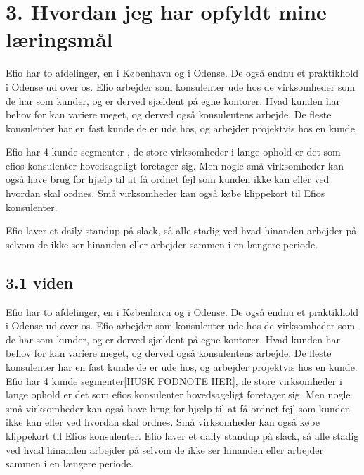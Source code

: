 \documentclass[11pt]{report}
\begin{document}
\chapter*{3. Hvordan jeg har opfyldt mine læringsmål}
Efio har to afdelinger, en i København og i Odense. De også endnu et praktikhold i Odense ud over os. 
Efio arbejder som konsulenter ude hos de virksomheder som de har som kunder, og er derved sjældent på egne kontorer. 
Hvad kunden har behov for kan variere meget, og derved også konsulentens arbejde. 
De fleste konsulenter har en fast kunde de er ude hos, og arbejder projektvis hos en kunde. 

Efio har 4 kunde segmenter , de store virksomheder i lange ophold er det som efios konsulenter hovedsageligt foretager sig. 
Men nogle små virksomheder kan også have brug for hjælp til at få ordnet fejl som kunden ikke kan eller ved hvordan skal ordnes. 
Små virksomheder kan også købe klippekort til Efios konsulenter.

Efio laver et daily standup på slack, så alle stadig ved hvad hinanden arbejder på selvom de ikke ser hinanden eller arbejder sammen 
i en længere periode. 

\section*{3.1 viden}
Efio har to afdelinger, en i København og i Odense. De også endnu et praktikhold i Odense ud over os. 
Efio arbejder som konsulenter ude hos de virksomheder som de har som kunder, og er derved sjældent på egne kontorer. 
Hvad kunden har behov for kan variere meget, og derved også konsulentens arbejde. 
De fleste konsulenter har en fast kunde de er ude hos, og arbejder projektvis hos en kunde. 
Efio har 4 kunde segmenter[HUSK FODNOTE HER], de store virksomheder i lange ophold er det som efios konsulenter 
hovedsageligt foretager sig. Men nogle små virksomheder kan også have brug for hjælp til at få ordnet fejl som 
kunden ikke kan eller ved hvordan skal ordnes. Små virksomheder kan også købe klippekort til Efios konsulenter.
Efio laver et daily standup på slack, så alle stadig ved hvad hinanden arbejder på selvom de ikke ser 
hinanden eller arbejder sammen i en længere periode. 
\end{document}

